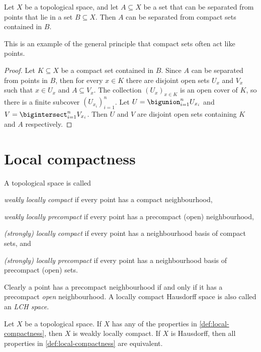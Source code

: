\documentclass[article, a4paper, 11pt, oneside]{memoir}
\numberwithin{equation}{chapter}
\begin{document}
\begin{lemma}
    \label{thm:separating_from_compacts}
    Let $X$ be a topological space, and let $A \subseteq X$ be a set that can be separated from points that lie in a set $B \subseteq X$. Then $A$ can be separated from compact sets contained in $B$.
\end{lemma}
%
This is an example of the general principle that compact sets often act like points.

\begin{proof}
    Let $K \subseteq X$ be a compact set contained in $B$. Since $A$ can be separated from points in $B$, then for every $x \in K$ there are disjoint open sets $U_x$ and $V_x$ such that $x \in U_x$ and $A \subseteq V_x$. The collection $(U_x)_{x \in K}$ is an open cover of $K$, so there is a finite subcover $(U_{x_i})_{i=1}^n$. Let $U = \bigunion_{i=1}^n U_{x_i}$ and $V = \bigintersect_{i=1}^n V_{x_i}$. Then $U$ and $V$ are disjoint open sets containing $K$ and $A$ respectively.
\end{proof}


\section{Local compactness}

\begin{definition}
    \label{def:local-compactness}
    A topological space is called
    \begin{enumdef}
        \item \emph{weakly locally compact} if every point has a compact neighbourhood,
        \item \emph{weakly locally precompact} if every point has a precompact (open) neighbourhood,
        \item \emph{(strongly) locally compact} if every point has a neighbourhood basis of compact sets, and
        \item \emph{(strongly) locally precompact} if every point has a neighbourhood basis of precompact (open) sets.
    \end{enumdef}
\end{definition}
%
Clearly a point has a precompact neighbourhood if and only if it has a precompact \emph{open} neighbourhood. A locally compact Hausdorff space is also called an \emph{LCH space}.

\begin{proposition}
    \label{thm:LCH-equivalent-condition}
    Let $X$ be a topological space. If $X$ has any of the properties in \cref{def:local-compactness}, then $X$ is weakly locally compact. If $X$ is Hausdorff, then all properties in \cref{def:local-compactness} are equivalent.
\end{proposition}
\end{document}

